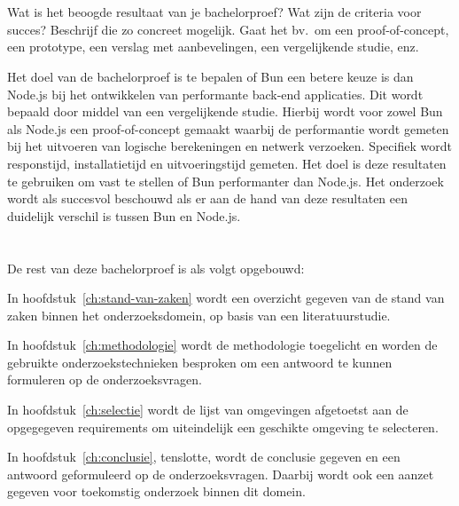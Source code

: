 \section{}%
\label{sec:onderzoeksdoelstelling}

Wat is het beoogde resultaat van je bachelorproef? 
Wat zijn de criteria voor succes? Beschrijf die zo concreet mogelijk.
Gaat het bv.\ om een proof-of-concept, een prototype, een verslag met aanbevelingen, een vergelijkende studie, enz.

Het doel van de bachelorproef is te bepalen of Bun een betere keuze is dan Node.js bij het
ontwikkelen van performante back-end applicaties. Dit wordt bepaald door middel van een vergelijkende studie.
Hierbij wordt voor zowel Bun als Node.js een proof-of-concept gemaakt waarbij de performantie wordt gemeten bij het uitvoeren van logische berekeningen 
en netwerk verzoeken. Specifiek wordt responstijd, installatietijd en uitvoeringstijd gemeten. 
Het doel is deze resultaten te gebruiken om vast te stellen of Bun performanter dan Node.js. 
Het onderzoek wordt als succesvol beschouwd als er aan de hand van deze resultaten een duidelijk verschil is tussen Bun en Node.js.
\section{}%
\label{sec:opzet-bachelorproef}


De rest van deze bachelorproef is als volgt opgebouwd:

In hoofdstuk~\ref{ch:stand-van-zaken} wordt een overzicht gegeven van de stand van zaken binnen het onderzoeksdomein,
 op basis van een literatuurstudie.

In hoofdstuk~\ref{ch:methodologie} wordt de methodologie toegelicht en worden de gebruikte onderzoekstechnieken besproken om een antwoord te kunnen formuleren 
op de onderzoeksvragen.

In hoofdstuk~\ref{ch:selectie} wordt de lijst van omgevingen afgetoetst aan de opgegegeven requirements om uiteindelijk een geschikte omgeving te selecteren.



In hoofdstuk~\ref{ch:conclusie}, tenslotte, 
wordt de conclusie gegeven en een antwoord geformuleerd op de onderzoeksvragen. 
Daarbij wordt ook een aanzet gegeven voor toekomstig onderzoek binnen dit domein.
